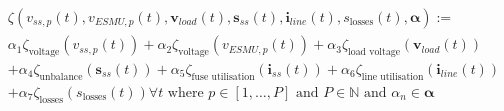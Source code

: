
\begin{multline}
	\zeta(v_{ss,p}(t), v_{ESMU,p}(t), \textbf{v}_{load}(t), \textbf{s}_{ss}(t), \textbf{i}_{line}(t), s_\text{losses}(t), \boldsymbol{\alpha}) :=\\
	\alpha_1 \zeta_\text{voltage}(v_{ss,p}(t))%
	+ \alpha_2 \zeta_\text{voltage}(v_{ESMU,p}(t))%
	+ \alpha_3 \zeta_\text{load voltage}(\textbf{v}_{load}(t))\\
	+ \alpha_4 \zeta_\text{unbalance}(\textbf{s}_{ss}(t))%
	+ \alpha_5 \zeta_\text{fuse utilisation}(\textbf{i}_{ss}(t))%
	+ \alpha_6 \zeta_\text{line utilisation}(\textbf{i}_{line}(t))\\
	+ \alpha_7 \zeta_\text{losses}(s_\text{losses}(t))%
	 \forall t \text{ where } p \in [1, \dots, P] \text{ and } P \in \mathbb{N} \text{ and } \alpha_n \in \boldsymbol{\alpha}
\label{ch1:equ:weighted-sum-cost-function}
\end{multline}